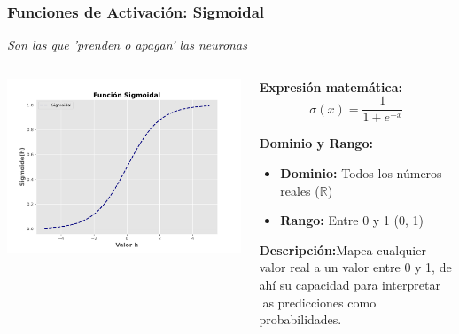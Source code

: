 
\begin{frame}
	\frametitle{Funciones de Activación: Sigmoidal}
	{\Large \textit{Son las que 'prenden o apagan' las neuronas}}
	\vspace{5mm}
	\begin{columns}
		
		\begin{column}{0.5\textwidth} %
			\vspace{-10mm}
			\includegraphics[width=\textwidth]{img/sigmoidal.pdf} %
		\end{column}
		
		\begin{column}{0.5\textwidth} %
			\textbf{Expresión matemática:}
			\vspace{-3mm}
			\[ \sigma(x) = \frac{1}{1 + e^{-x}} \]

			\textbf{Dominio y Rango:}
			\begin{itemize}
				\item \textbf{Dominio:} Todos los números reales ($\mathbb{R}$)
				\item \textbf{Rango:} Entre 0 y 1 (0, 1)
			\end{itemize}
			
			\textbf{Descripción:}Mapea cualquier valor real a un valor entre 0 y 1, de ahí su capacidad para interpretar las predicciones como probabilidades.
		\end{column}
		
		
	\end{columns}

\end{frame}

